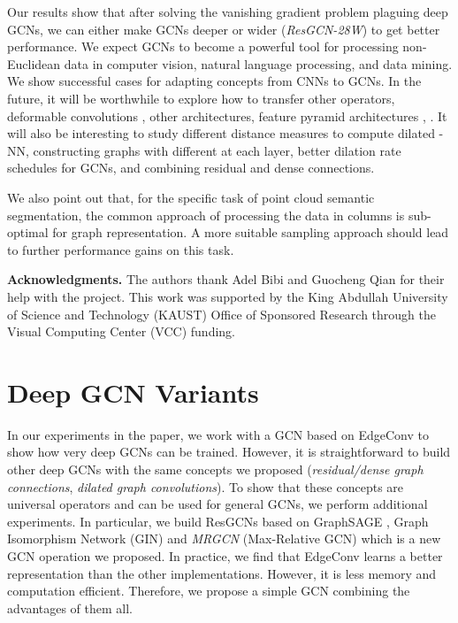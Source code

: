 \documentclass[10pt,twocolumn,letterpaper]{article}
\newcommand{\mysection}[1]{\vspace{3pt}\noindent\textbf{#1.}}
\begin{document}
Our results show that after solving the vanishing gradient problem plaguing deep GCNs, we can either make GCNs deeper or wider (\eg \emph{ResGCN-28W}) to get better performance. We expect GCNs to become a powerful tool for processing non-Euclidean data in computer vision, natural language processing, and data mining. We show successful cases for adapting concepts from CNNs to GCNs. In the future, it will be worthwhile to explore how to transfer other operators, \eg deformable convolutions \cite{dai2017deformable}, other architectures, \eg feature pyramid architectures \cite{zhao2017pyramid}, \etc. It will also be interesting to study different distance measures to compute dilated -NN, constructing graphs with different  at each layer, better dilation rate schedules \cite{chen2017rethinking, wang2018understanding} for GCNs, and combining residual and dense connections. 

We also point out that, for the specific task of point cloud semantic segmentation, the common approach of processing the data in  columns is sub-optimal for graph representation. A more suitable sampling approach should lead to further performance gains on this task.

\mysection{Acknowledgments} The authors thank Adel Bibi and Guocheng Qian for their help with the project. This work was supported by the King Abdullah University of Science and Technology (KAUST) Office of Sponsored Research through the Visual Computing Center (VCC) funding.

{\small


}

\clearpage
\appendix

\section{Deep GCN Variants} \label{appendix:gcn_variants}
In our experiments in the paper, we work with a GCN based on EdgeConv \cite{wang2018dynamic} to show how very deep GCNs can be trained. However, it is straightforward to build other deep GCNs with the same concepts we proposed (\eg \emph{residual/dense graph connections}, \emph{dilated graph convolutions}). To show that these concepts are universal operators and can be used for general GCNs, we perform additional experiments. In particular, we build ResGCNs based on GraphSAGE \cite{hamilton2017inductive}, Graph Isomorphism Network (GIN) \cite{xu2018powerful} and \emph{MRGCN} (Max-Relative GCN) which is a new GCN operation we proposed. In practice, we find that EdgeConv learns a better representation than the other implementations. However, it is less memory and computation efficient. Therefore, we propose a simple GCN combining the advantages of them all. 
\end{document}
